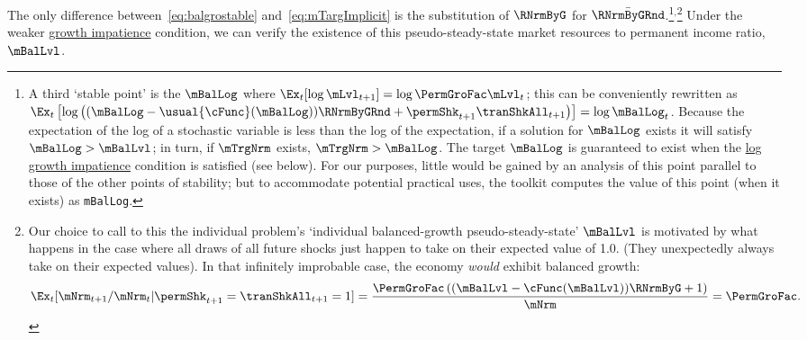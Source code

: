 \documentclass[BufferStockTheory]{subfiles}
\begin{document}
The only difference between~\eqref{eq:balgrostable} and~\eqref{eq:mTargImplicit} is the substitution of $\RNrmByG$ for $\bar{\RNrmByGRnd}$.\footnote{A third `stable point' is the $\mBalLog$ where $\Ex_{t}[\log \mLvl_{t+1}] = \log \PermGroFac \mLvl_{t}$; this can be conveniently rewritten as $\Ex_{t}\left[\log\left((\mBalLog-\usual{\cFunc}(\mBalLog))\RNrmByGRnd+\permShk_{t+1}\tranShkAll_{t+1}\right)\right]  = \log \mBalLog_{t}$.
Because the expectation of the log of a stochastic variable is less than the log of the expectation, if a solution for $\mBalLog$ exists it will satisfy $\mBalLog > \mBalLvl$; in turn, if $\mTrgNrm$ exists, $\mTrgNrm>\mBalLog$.
The target $\mBalLog$ is guaranteed to exist when the \hyperlink{GICSdl}{log growth impatience} condition is satisfied (see below).
For our purposes, little would be gained by an analysis of this point parallel to those of the other points of stability; but to accommodate potential practical uses,  the {\ARKurl} toolkit computes the value of this point (when it exists) as \texttt{mBalLog}.}$^{,}$\footnote{Our choice to call to this the individual problem's `individual balanced-growth pseudo-steady-state' $\mBalLvl$ is motivated by what happens in the case where all draws of all future shocks just happen to take on their expected value of 1.0.
(They unexpectedly always take on their expected values).
In that infinitely improbable case, the economy \textit{would} exhibit balanced growth:
  \begin{align*}
    \Ex_{t}[\mNrm_{t+1}/\mNrm_{t}|\permShk_{t+1}=\tranShkAll_{t+1}=1] = \frac{\PermGroFac \left((\mBalLvl-\cFunc(\mBalLvl))\RNrmByG + 1 \right)}{\mNrm} = \PermGroFac.
  \end{align*}}
Under the weaker  \hyperlink{GIC}{growth impatience} condition, we can verify the existence of this pseudo-steady-state market resources to permanent income ratio, $\mBalLvl$.
\end{document}
